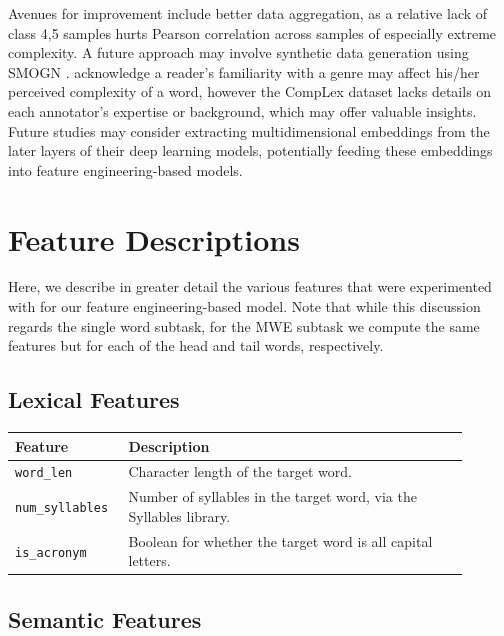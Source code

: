 \documentclass{dcthesis}
\theoremstyle{definition}
\theoremstyle{remark}
\begin{document}
Avenues for improvement include better data aggregation, as a relative lack of class 4,5 samples hurts Pearson correlation across samples of especially extreme complexity. A future approach may involve synthetic data generation using SMOGN \citep{branco2017smogn}. \citet{shardlow2020complex} acknowledge a reader's familiarity with a genre may affect his/her perceived complexity of a word, however the CompLex dataset lacks details on each annotator's expertise or background, which may offer valuable insights. Future studies may consider extracting multidimensional embeddings from the later layers of their deep learning models, potentially feeding these embeddings into feature engineering-based models.

\appendix

\chapter{Feature Descriptions}
\label{appendix:descriptions}

Here, we describe in greater detail the various features that were experimented with for our feature engineering-based model. Note that while this discussion regards the single word subtask, for the MWE subtask we compute the same features but for each of the head and tail words, respectively.

\section{Lexical Features}

\begin{table}[H]
  \centering
  \begin{tabular}{>{\centering\arraybackslash}p{0.2\linewidth}>{\arraybackslash}p{0.7\linewidth}}
    \textbf{Feature} & \textbf{Description} \\ \hline 
    \texttt{word\_len} & Character length of the target word.\\
    \hline 
    \texttt{num\_syllables} & Number of syllables in the target word, via the Syllables library.\\
    \hline 
    \texttt{is\_acronym} & Boolean for whether the target word is all capital letters.\\
  \end{tabular}
  \label{lexical_features}
\end{table}

\section{Semantic Features}
\end{document}
